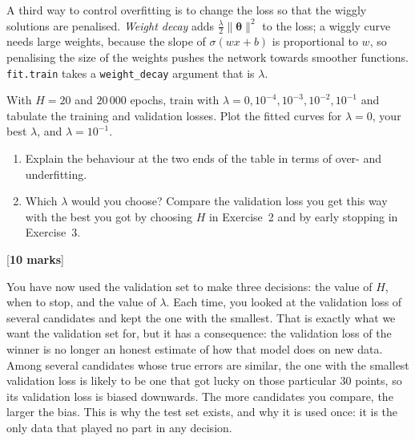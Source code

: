 \documentclass[11pt,a4paper]{article}
\newcounter{exercise}
\newenvironment{exercise}[1]{\refstepcounter{exercise}\begin{tcolorbox}[colback=blue!4,colframe=blue!50!black,title=Exercise \theexercise: #1,fonttitle=\bfseries]}{\end{tcolorbox}}
\newcommand{\mk}[1]{\hfill[\textbf{#1 marks}]}
\begin{document}
A third way to control overfitting is to change the loss so that the wiggly solutions are penalised. \emph{Weight decay} adds $\tfrac{\lambda}{2}\|\bm\theta\|^2$ to the loss; a wiggly curve needs large weights, because the slope of $\sigma(w x + b)$ is proportional to $w$, so penalising the size of the weights pushes the network towards smoother functions. \texttt{fit.train} takes a \texttt{weight\_decay} argument that is $\lambda$.

\begin{exercise}{weight decay}
With $H = 20$ and $20\,000$ epochs, train with $\lambda = 0, 10^{-4}, 10^{-3}, 10^{-2}, 10^{-1}$ and tabulate the training and validation losses. Plot the fitted curves for $\lambda = 0$, your best $\lambda$, and $\lambda = 10^{-1}$.
\begin{enumerate}[label=(\alph*)]
\item Explain the behaviour at the two ends of the table in terms of over- and underfitting.
\item Which $\lambda$ would you choose? Compare the validation loss you get this way with the best you got by choosing $H$ in Exercise~2 and by early stopping in Exercise~3.
\end{enumerate}
\mk{10}
\end{exercise}

You have now used the validation set to make three decisions: the value of $H$, when to stop, and the value of $\lambda$. Each time, you looked at the validation loss of several candidates and kept the one with the smallest. That is exactly what we want the validation set for, but it has a consequence: the validation loss of the winner is no longer an honest estimate of how that model does on new data. Among several candidates whose true errors are similar, the one with the smallest validation loss is likely to be one that got lucky on those particular 30 points, so its validation loss is biased downwards. The more candidates you compare, the larger the bias. This is why the test set exists, and why it is used once: it is the only data that played no part in any decision.
\end{document}
